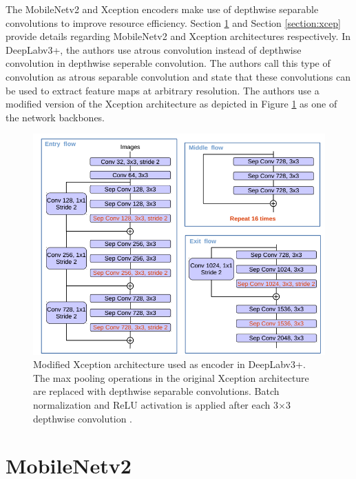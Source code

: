 The MobileNetv2 and Xception encoders make use of depthwise separable convolutions to improve resource efficiency. Section \ref{section:mn} and Section \ref{section:xcep} provide details regarding MobileNetv2 and Xception architectures respectively. In DeepLabv3+, the authors use atrous convolution instead of depthwise convolution in depthwise seperable convolution. The authors call this type of convolution as atrous separable convolution and state that these convolutions can be used to extract feature maps at arbitrary resolution. The authors use a modified version of the Xception architecture as depicted in Figure \ref{Fig:deepLabv4_xcep} as one of the network backbones.

	\begin{figure}
		\centering
		\includegraphics[width=.8\linewidth]{images/deepLabv4_xcep}
		\caption{Modified Xception architecture used as encoder in DeepLabv3+. The max pooling operations in the original Xception architecture are replaced with depthwise separable convolutions. Batch normalization and ReLU activation is applied after each 3$\times$3 depthwise convolution \cite{DBLP:journals/corr/abs-1802-02611}.}
		\label{Fig:deepLabv4_xcep}
	\end{figure}

\section{MobileNetv2}
\label{section:mn}



